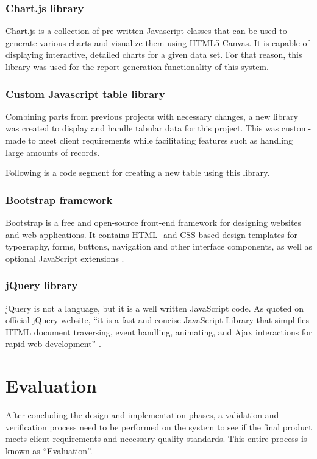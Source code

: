 \documentclass[12pt]{report}
\begin{document}
\subsection{Chart.js library}
Chart.js is a collection of pre-written Javascript classes that can be used to generate various charts and visualize them using HTML5 Canvas. It is capable of displaying interactive, detailed charts for a given data set. For that reason, this library was used for the report generation functionality of this system.

\subsection{Custom Javascript table library}
Combining parts from previous projects with necessary changes, a new library was created to display and handle tabular data for this project. This was custom-made to meet client requirements while facilitating features such as handling large amounts of records.

\noindent
Following is a code segment for creating a new table using this library.



\subsection{Bootstrap framework}
Bootstrap is a free and open-source front-end framework for designing
websites and web applications. It contains HTML- and CSS-based design templates for typography, forms, buttons, navigation and other interface components, as well as optional JavaScript extensions \cite{chahal_2019_bootstrap}.

\subsection{jQuery library}
jQuery is not a language, but it is a well written JavaScript code. As quoted on
official jQuery website, ``it is a fast and concise JavaScript Library that simplifies HTML document traversing, event handling, animating, and Ajax interactions for rapid web development'' \cite{chaffer_2007_jquery}.

\chapter{Evaluation}
After concluding the design and implementation phases, a validation and verification process need to be performed on the system to see if the final product meets client requirements and necessary quality standards. This entire process is known as ``Evaluation''.
\end{document}
